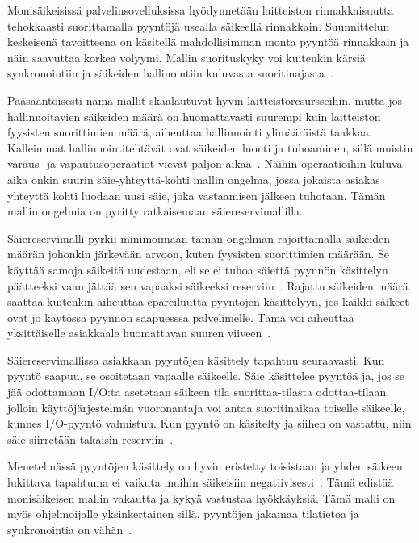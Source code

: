 \documentclass[finnish]{tktltiki2}
\theoremstyle{definition}
\theoremstyle{remark}
\begin{document}
Monisäikeisissä palvelinsovelluksissa hyödynnetään laitteiston
rinnakkaisuutta tehokkaasti suorittamalla pyyntöjä usealla säikeellä rinnakkain.
Suunnittelun keskeisenä tavoitteena on käsitellä mahdollisimman monta pyyntöä rinnakkain ja
näin saavuttaa korkea volyymi. Mallin suorituskyky voi kuitenkin
kärsiä synkronointiin ja säikeiden hallinointiin kuluvasta
suoritinajasta~\cite{pyarali_proactor_1997}.

Pääsääntöisesti nämä mallit skaalautuvat hyvin laitteistoresursseihin,
mutta jos hallinnoitavien säikeiden määrä on huomattavasti suurempi kuin laitteiston
fyysisten suorittimien määrä, aiheuttaa hallinnointi ylimääräistä taakkaa.
Kalleimmat hallinnointitehtävät ovat säikeiden luonti ja tuhoaminen, sillä
muistin varaus- ja vapautusoperaatiot vievät paljon aikaa~\cite{ling_analysis_2000}.
Näihin operaatioihin kuluva aika onkin suurin säie-yhteyttä-kohti mallin
ongelma, jossa jokaista asiakas yhteyttä kohti
luodaan uusi säie, joka vastaamisen jälkeen tuhotaan.
Tämän mallin ongelmia on pyritty ratkaisemaan säiereservimallilla.

Säiereservimalli pyrkii minimoimaan tämän ongelman rajoittamalla
säikeiden määrän johonkin järkevään arvoon, kuten fyysisten suorittimien
määrään. Se käyttää samoja säikeitä uudestaan, eli se ei tuhoa säiettä
pyynnön käsittelyn päätteeksi vaan jättää sen vapaaksi säikeeksi reserviin~\cite{ling_analysis_2000}. Rajattu säikeiden määrä saattaa kuitenkin aiheuttaa epäreiluutta
pyyntöjen käsittelyyn, jos kaikki säikeet ovat jo käytössä pyynnön 
saapuesssa palvelimelle. Tämä voi aiheuttaa yksittäiselle asiakkaale
huomattavan suuren viiveen~\cite{welsh_seda_2001}.

Säiereservimallissa asiakkaan pyyntöjen käsittely tapahtuu seuraavasti.
Kun pyyntö saapuu, se osoitetaan vapaalle säikeelle. Säie käsittelee pyyntöä ja,
jos se jää odottamaan I/O:ta asetetaan säikeen tila suorittaa-tilasta odottaa-tilaan,
jolloin käyttöjärjestelmän vuoronantaja voi antaa suoritinaikaa toiselle säikeelle,
kunnes I/O-pyyntö valmistuu. Kun pyyntö on käsitelty ja siihen on vastattu, niin
säie siirretään takaisin reserviin~\cite{ling_analysis_2000}.

Menetelmässä pyyntöjen käsittely on hyvin eristetty toisistaan ja
yhden säikeen lukittava tapahtuma ei vaikuta muihin säikeisiin negatiivisesti~\cite{davis_case_2017}.
Tämä edistää monisäikeisen mallin vakautta ja kykyä vastustaa hyökkäyksiä.
Tämä malli on myös ohjelmoijalle yksinkertainen sillä, pyyntöjen jakamaa tilatietoa
ja synkronointia on vähän~\cite{hu_applying_1998}.
\end{document}

